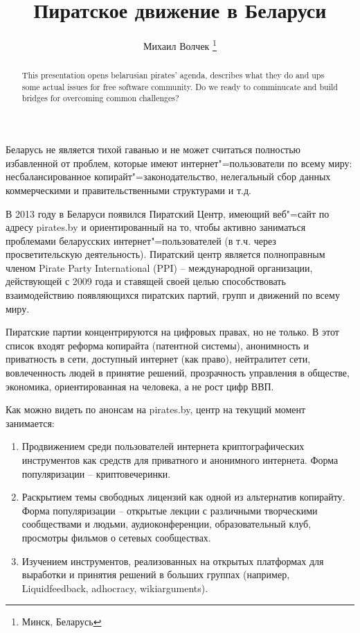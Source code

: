 \documentclass[10pt, a5paper]{article}
\begin{document}
\title{Пиратское движение в Беларуси}
\author{Михаил Волчек \footnote{Минск, Беларусь}}
\maketitle
\begin{abstract}
This presentation opens belarusian pirates' agenda, describes what they do and ups some actual issues for free software \linebreak community. Do we ready to comminucate and build bridges for overcoming common challenges?
\end{abstract}
Беларусь не является тихой гаванью и не может считаться полностью избавленной от проблем, которые имеют интернет"=пользователи по всему миру: несбалансированное копирайт"=законодательство, нелегальный сбор данных коммерческими и правительственными структурами и т.д.

В 2013 году в Беларуси появился Пиратский Центр, имеющий веб"=сайт по адресу pirates.by и ориентированный на то, чтобы активно заниматься проблемами беларусских интернет"=пользователей (в т.ч. через просветительскую деятельность).
Пиратский центр является полноправным членом Pirate Party International (PPI) -- международной организации, действующей с 2009 года и ставящей своей целью способствовать взаимодействию появляющихся пиратских партий, групп и движений по всему миру.

Пиратские партии концентрируются на цифровых правах, но не только. В этот список входят реформа копирайта (патентной системы), анонимность и приватность в сети, доступный интернет (как право), нейтралитет сети, вовлеченность людей в принятие решений, прозрачность управления в обществе, экономика, ориентированная на человека, а не рост цифр ВВП.

Как можно видеть по анонсам на pirates.by, центр на текущий момент занимается:

\begin{enumerate}
  \item Продвижением среди пользователей интернета криптографических
инструментов как средств для приватного и анонимного интернета. Форма популяризации -- криптовечеринки.
  \item Раскрытием темы свободных лицензий как одной из альтернатив копирайту. Форма популяризации --  открытые лекции с различными творческими сообществами и людьми, аудиоконференции, образовательный клуб, просмотры фильмов о сетевых сообществах.
  \item Изучением инструментов, реализованных на открытых платформах для
выработки и принятия решений в больших группах (например,
Liquidfeedback, adhocracy, wikiarguments).
\end{enumerate}
\end{document}
